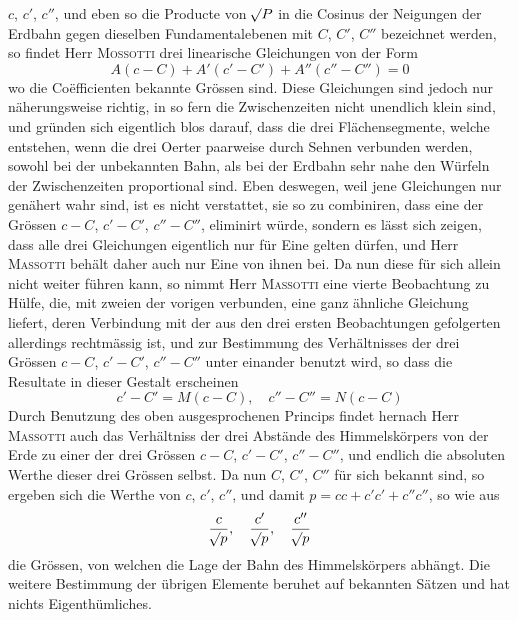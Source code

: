 $c$, $c'$, $c''$, und eben so die Producte von $\mathord{{}^{}\!\surd}P$ in die Cosinus der Neigungen der Erdbahn gegen dieselben
Fundamentalebenen mit $C$, $C'$, $C''$ bezeichnet werden, so findet Herr \textsc{Mossotti} drei linearische Gleichungen von der Form
\[
A(c-C)+A'(c'-C')+A''(c''-C'') = 0
\] 
wo die Coëfficienten bekannte Grössen sind. Diese Gleichungen sind jedoch nur näherungsweise richtig,
in so fern die Zwischenzeiten nicht unendlich klein sind, und gründen sich eigentlich blos darauf, dass
die drei Flächensegmente, welche entstehen, wenn die drei Oerter paarweise durch Sehnen verbunden
werden, sowohl bei der unbekannten Bahn, als bei der Erdbahn sehr nahe den Würfeln der Zwischenzeiten proportional sind. Eben deswegen, weil jene Gleichungen nur genähert wahr sind, ist es nicht
verstattet, sie so zu combiniren, dass eine der Grössen $c-C$, $c'-C'$, $c''-C''$, eliminirt würde, sondern
es lässt sich zeigen, dass alle drei Gleichungen eigentlich nur für Eine gelten dürfen, und Herr \textsc{Massotti} behält daher auch nur Eine von ihnen bei. Da nun diese für sich allein nicht weiter führen kann,
so nimmt Herr \textsc{Massotti} eine vierte Beobachtung zu Hülfe, die, mit zweien der vorigen verbunden, eine
ganz ähnliche Gleichung liefert, deren Verbindung mit der aus den drei ersten Beobachtungen gefolgerten allerdings rechtmässig ist, und zur Bestimmung des Verhältnisses der drei Grössen $c-C$, $c'-C'$,
$c''-C''$ unter einander benutzt wird, so dass die Resultate in dieser Gestalt erscheinen
\[
c'-C' = M(c-C), \quad c''-C'' = N(c-C)
\]
Durch Benutzung des oben ausgesprochenen Princips findet hernach Herr \textsc{Massotti} auch das Verhältniss
der drei Abstände des Himmelskörpers von der Erde zu einer der drei Grössen $c-C$, $c'-C'$, $c''-C''$,
und endlich die absoluten Werthe dieser drei Grössen selbst. Da nun $C$, $C'$, $C''$ für sich bekannt sind,
so ergeben sich die Werthe von $c$, $c'$, $c''$, und damit $p = cc+c'c'+c''c''$, so wie aus
\[
\frac{c}{\mathord{{}^{}\!\surd}p}, \quad \frac{c'}{\mathord{{}^{}\!\surd}p}, \quad \frac{c''}{\mathord{{}^{}\!\surd}p}
\]
die Grössen, von welchen die Lage der Bahn des Himmelskörpers abhängt. Die weitere Bestimmung
der übrigen Elemente beruhet auf bekannten Sätzen und hat nichts Eigenthümliches.

